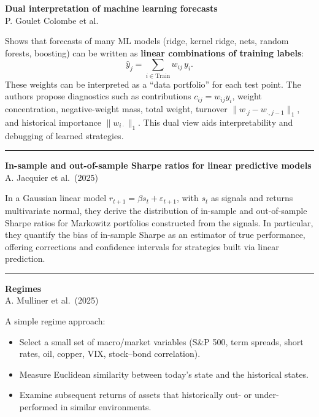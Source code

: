 \documentclass[a5paper]{article}
\providecommand{\tightlist}{%
  \setlength{\itemsep}{0pt}\setlength{\parskip}{0pt}}
\begin{document}
\textbf{Dual interpretation of machine learning forecasts}\\
P. Goulet Colombe et al.

Shows that forecasts of many ML models (ridge, kernel ridge, nets,
random forests, boosting) can be written as \textbf{linear combinations
of training labels}:
\[ \hat y_j = \sum_{i\in \text{Train}} w_{ij}\, y_i. \]
These weights can be interpreted as a ``data portfolio'' for each test
point. The authors propose diagnostics such as contributions
$c_{ij}=w_{ij}y_i$, weight concentration, negative-weight mass,
total weight, turnover $\| w_{\cdot j}-w_{\cdot, j-1}\|_1$, and historical importance
$\| w_{i\cdot}\|_1$. This dual view aids interpretability
and debugging of learned strategies.

\begin{center}\rule{0.5\linewidth}{0.5pt}\end{center}

\textbf{In-sample and out-of-sample Sharpe ratios for linear predictive
models}\\
A. Jacquier et al.~(2025)

In a Gaussian linear model $r_{t+1} = \beta s_t +
\varepsilon_{t+1}$, with $s_t$ as signals and returns multivariate
normal, they derive the distribution of in-sample and out-of-sample
Sharpe ratios for Markowitz portfolios constructed from the signals. In
particular, they quantify the bias of in-sample Sharpe as an estimator
of true performance, offering corrections and confidence intervals for
strategies built via linear prediction.

\begin{center}\rule{0.5\linewidth}{0.5pt}\end{center}

\textbf{Regimes}\\
A. Mulliner et al.~(2025)

A simple regime approach:

\begin{itemize}
\tightlist
\item
  Select a small set of macro/market variables (S\&P 500, term spreads,
  short rates, oil, copper, VIX, stock--bond correlation).
\item
  Measure Euclidean similarity between today's state and the historical
  states.
\item
  Examine subsequent returns of assets that historically out- or
  under-performed in similar environments.
\end{itemize}
\end{document}
